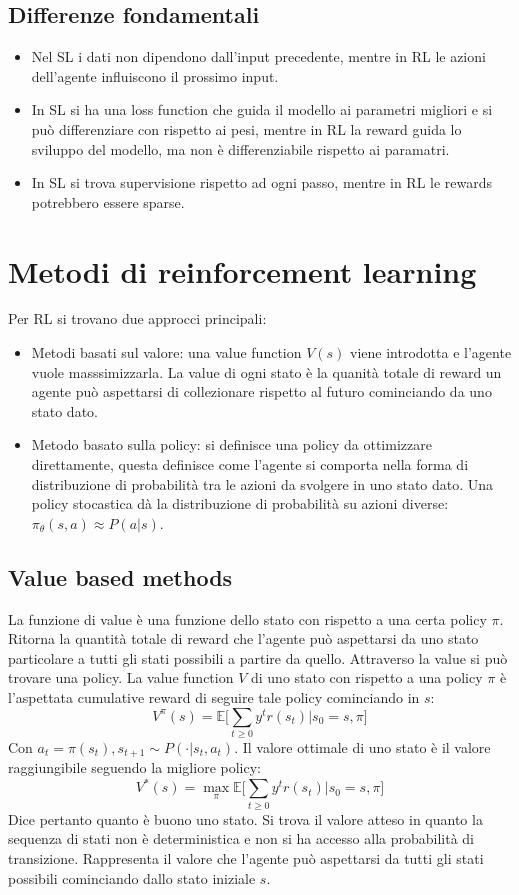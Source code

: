 \subsection{Differenze fondamentali}
\begin{itemize}
	\item Nel SL i dati non dipendono dall'input precedente, mentre in RL le azioni dell'agente influiscono il prossimo input.
	\item In SL si ha una loss function che guida il modello ai parametri migliori e si pu\`o differenziare con rispetto ai pesi, mentre in RL la reward guida lo sviluppo del modello, ma non \`e differenziabile rispetto ai paramatri.
	\item In SL si trova supervisione rispetto ad ogni passo, mentre in RL le rewards potrebbero essere sparse.
\end{itemize}

\section{Metodi di reinforcement learning}
Per RL si trovano due approcci principali:
\begin{itemize}
	\item Metodi basati sul valore: una value function $V(s)$ viene introdotta e l'agente vuole masssimizzarla.
	La value di ogni stato \`e la quanit\`a totale di reward un agente pu\`o aspettarsi di collezionare rispetto al futuro cominciando da uno stato dato.
	\item Metodo basato sulla policy: si definisce una policy da ottimizzare direttamente, questa definisce come l'agente si comporta nella forma di distribuzione di probabilit\`a tra le azioni da svolgere in uno stato dato.
	Una policy stocastica d\`a la distribuzione di probabilit\`a su azioni diverse: $\pi_\theta(s,a)\approx P(a|s)$.
	
\end{itemize}

\subsection{Value based methods}
La funzione di value \`e una funzione dello stato con rispetto a una certa policy $\pi$.
Ritorna la quantit\`a totale di reward che l'agente pu\`o aspettarsi da uno stato particolare a tutti gli stati possibili a partire da quello.
Attraverso la value si pu\`o trovare una policy.
La value function $V$ di uno stato con rispetto a una policy $\pi$ \`e l'aspettata cumulative reward di seguire tale policy cominciando in $s$:
$$V^\pi(s) = \mathbb{E}\biggl[\sum\limits_{t\ge 0} y^tr(s_t)|s_0 = s,\pi\biggr]$$
Con $a_t = \pi(s_t), s_{t+1}\sim P(\cdot|s_t, a_t)$.
Il valore ottimale di uno stato \`e il valore raggiungibile seguendo la migliore policy:
$$V^*(s) = \max_\pi\mathbb{E}\biggl[\sum\limits_{t\ge 0} y^tr(s_t)|s_0 = s,\pi\biggr]$$
Dice pertanto quanto \`e buono uno stato.
Si trova il valore atteso in quanto la sequenza di stati non \`e deterministica e non si ha accesso alla probabilit\`a di transizione.
Rappresenta il valore che l'agente pu\`o aspettarsi da tutti gli stati possibili cominciando dallo stato iniziale $s$.

